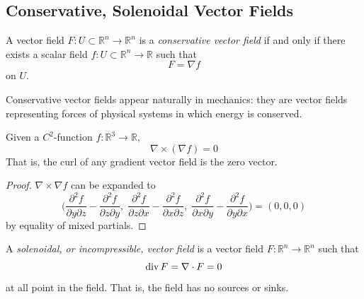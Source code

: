 \subsection{Conservative, Solenoidal Vector Fields}

  \begin{definition}
  A vector field $F: U \subset \mathbb{R}^n \longrightarrow \mathbb{R}^n$ is a \textit{conservative vector field} if and only if there exists a scalar field $f: U \subset \mathbb{R}^n \longrightarrow \mathbb{R}$ such that 
  \[F = \nabla f\]
  on $U$. 
  \end{definition}

  Conservative vector fields appear naturally in mechanics: they are vector fields representing forces of physical systems in which energy is conserved. 

  \begin{theorem}
  Given a $C^2$-function $f: \mathbb{R}^3 \longrightarrow \mathbb{R}$,
  \[\nabla \times ( \nabla f) = 0\]
  That is, the curl of any gradient vector field is the zero vector. 
  \end{theorem}
  \begin{proof}
  $\nabla \times \nabla f$ can be expanded to
  \[\bigg( \frac{\partial^2 f}{\partial y \partial z} - \frac{\partial^2 f}{\partial z \partial y}, \; \frac{\partial^2 f}{\partial z \partial x} - \frac{\partial^2 f}{\partial x \partial z}, \; \frac{\partial^2 f}{\partial x \partial y} - \frac{\partial^2 f}{\partial y \partial x}\bigg) = (0, 0, 0)\]
  by equality of mixed partials. 
  \end{proof}

  \begin{definition}
  A \textit{solenoidal, or incompressible, vector field} is a vector field $F: \mathbb{R}^n \longrightarrow \mathbb{R}^n$ such that
  \[\operatorname{div} F = \nabla \cdot F = 0\]
  at all point in the field. That is, the field has no sources or sinks. 
  \end{definition}

